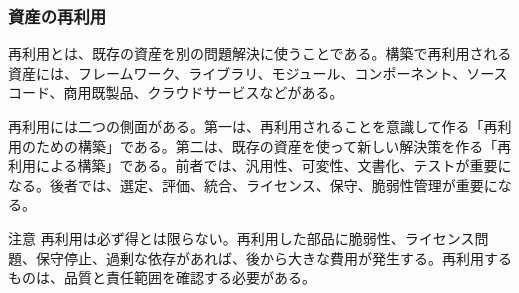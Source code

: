 \subsubsection{資産の再利用}

再利用とは、既存の資産を別の問題解決に使うことである。構築で再利用される資産には、フレームワーク、ライブラリ、モジュール、コンポーネント、ソースコード、商用既製品、クラウドサービスなどがある。

再利用には二つの側面がある。第一は、再利用されることを意識して作る「再利用のための構築」である。第二は、既存の資産を使って新しい解決策を作る「再利用による構築」である。前者では、汎用性、可変性、文書化、テストが重要になる。後者では、選定、評価、統合、ライセンス、保守、脆弱性管理が重要になる。

\begin{keybox}{注意}
再利用は必ず得とは限らない。再利用した部品に脆弱性、ライセンス問題、保守停止、過剰な依存があれば、後から大きな費用が発生する。再利用するものは、品質と責任範囲を確認する必要がある。
\end{keybox}
